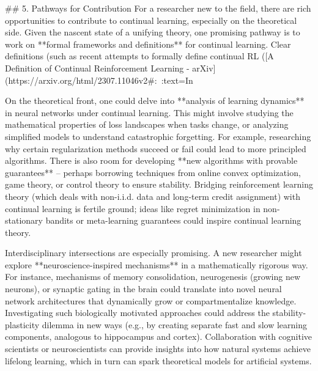 ## 5. Pathways for Contribution
For a researcher new to the field, there are rich opportunities to contribute to continual learning, especially on the theoretical side. Given the nascent state of a unifying theory, one promising pathway is to work on **formal frameworks and definitions** for continual learning. Clear definitions (such as recent attempts to formally define continual RL ([A Definition of Continual Reinforcement Learning - arXiv](https://arxiv.org/html/2307.11046v2#:~:text=In%

On the theoretical front, one could delve into **analysis of learning dynamics** in neural networks under continual learning. This might involve studying the mathematical properties of loss landscapes when tasks change, or analyzing simplified models to understand catastrophic forgetting. For example, researching why certain regularization methods succeed or fail could lead to more principled algorithms. There is also room for developing **new algorithms with provable guarantees** – perhaps borrowing techniques from online convex optimization, game theory, or control theory to ensure stability. Bridging reinforcement learning theory (which deals with non-i.i.d. data and long-term credit assignment) with continual learning is fertile ground; ideas like regret minimization in non-stationary bandits or meta-learning guarantees could inspire continual learning theory.

Interdisciplinary intersections are especially promising. A new researcher might explore **neuroscience-inspired mechanisms** in a mathematically rigorous way. For instance, mechanisms of memory consolidation, neurogenesis (growing new neurons), or synaptic gating in the brain could translate into novel neural network architectures that dynamically grow or compartmentalize knowledge. Investigating such biologically motivated approaches could address the stability-plasticity dilemma in new ways (e.g., by creating separate fast and slow learning components, analogous to hippocampus and cortex). Collaboration with cognitive scientists or neuroscientists can provide insights into how natural systems achieve lifelong learning, which in turn can spark theoretical models for artificial systems.

